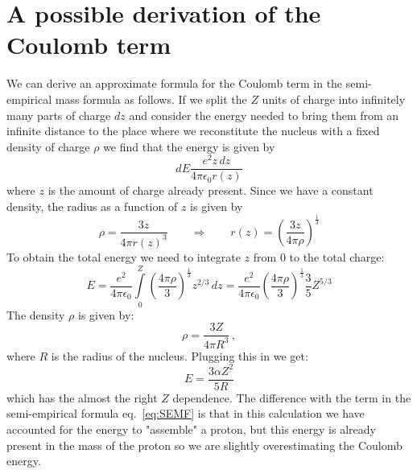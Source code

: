 \documentclass[12pt]{article}
\begin{document}
\section{A possible derivation of the Coulomb term}
We can derive an approximate formula for the Coulomb term in the semi-empirical mass formula as follows. If we split the $Z$ units of charge into infinitely many parts of charge $dz$ and consider the energy needed to bring them from an infinite distance to the place where we reconstitute the nucleus with a fixed density of charge $\rho$ we find that the energy is given by 
\[dE\frac{e^2 z\,dz}{4\pi\epsilon_0 r(z)}\]
where $z$ is the amount of charge already present. Since we have a constant density, the radius as a function of $z$ is given by
\[\rho=\frac{3 z}{4\pi r(z)^3}\qquad \Rightarrow \qquad r(z)=\left(\frac{3z}{4\pi\rho}\right)^{\frac{1}{3}}\]
To obtain the total energy we need to integrate $z$ from 0 to the total charge:
\[E=\frac{e^2}{4\pi\epsilon_0}\int\limits_0^{Z}\left(\frac{4\pi\rho}{3}\right)^{\frac{1}{3}}z^{2/3}\,dz=\frac{e^2}{4\pi\epsilon_0} \left(\frac{4\pi\rho}{3}\right)^{\frac{1}{3}}\frac{3}{5}Z^{5/3}\] 
The density $\rho$ is given by:
\[\rho=\frac{3Z}{4\pi R^3}\,,\]
where $R$ is the radius of the nucleus. Plugging this in we get:
\[E=\frac{3\alpha Z^2}{5 R}\] 
which has the almost the right $Z$ dependence. The difference with the term in the semi-empirical formula eq.~\ref{eq:SEMF} is that in this calculation we have accounted for the energy to "assemble" a proton, but this energy is already present in the mass of the proton so we are slightly overestimating the Coulomb energy.   
\end{document}
